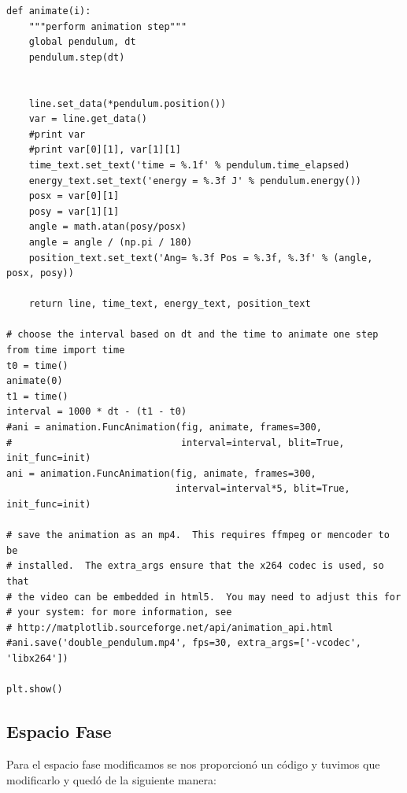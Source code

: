 \documentclass[12pt,letterpaper]{article}
\begin{document}
\begin{verbatim}
def animate(i):
    """perform animation step"""
    global pendulum, dt
    pendulum.step(dt)
    

    line.set_data(*pendulum.position())
    var = line.get_data()
    #print var
    #print var[0][1], var[1][1]
    time_text.set_text('time = %.1f' % pendulum.time_elapsed)
    energy_text.set_text('energy = %.3f J' % pendulum.energy())
    posx = var[0][1]
    posy = var[1][1]
    angle = math.atan(posy/posx)
    angle = angle / (np.pi / 180)
    position_text.set_text('Ang= %.3f Pos = %.3f, %.3f' % (angle, posx, posy))
    
    return line, time_text, energy_text, position_text

# choose the interval based on dt and the time to animate one step
from time import time
t0 = time()
animate(0)
t1 = time()
interval = 1000 * dt - (t1 - t0)
#ani = animation.FuncAnimation(fig, animate, frames=300,
#                              interval=interval, blit=True, init_func=init)
ani = animation.FuncAnimation(fig, animate, frames=300,
                              interval=interval*5, blit=True, init_func=init)

# save the animation as an mp4.  This requires ffmpeg or mencoder to be
# installed.  The extra_args ensure that the x264 codec is used, so that
# the video can be embedded in html5.  You may need to adjust this for
# your system: for more information, see
# http://matplotlib.sourceforge.net/api/animation_api.html
#ani.save('double_pendulum.mp4', fps=30, extra_args=['-vcodec', 'libx264'])

plt.show()
\end{verbatim}

\subsection*{Espacio Fase}
Para el espacio fase modificamos se nos proporcionó un código y tuvimos que modificarlo y quedó de la siguiente manera:
\end{document}

